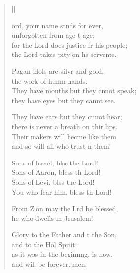\settowidth{\versewidth}{for the Lord does justice for his people; *}
\begin{verse}[\versewidth]
  \begin{patverse}
ord, your name stnds for ever,\Med\\
unforgotten from age t age:\\
for the Lord does justice fr his people;\Med\\
the Lord takes pity on h\pointup{\i}s servants.

Pagan idols are silvr and gold,\Med\\
the work of humn hands.\\
They have mouths but they cnnot speak;\Med\\
they have eyes but they cannt see.

They have ears but they cnnot hear;\Med\\
there is never a breath on thir lips.\\
Their makers will becme like them\Med\\
and so will all who trust \pointup{\i}n them!

Sons of Israel, blss the Lord!\Med\\
Sons of Aaron, bless th Lord!\\
Sons of Levi, blss the Lord!\Med\\
You who fear him, bless th Lord!

From Zion may the Lrd be blessed,\Med\\
he who dwells in Jrusalem!

Glory to the Father and t the Son,\Med\\
and to the Hol Spirit:\\
as it was in the beginn\pointup{\i}ng, is now,\Med\\
and will be forever. men.
  \end{patverse}
\end{verse}
